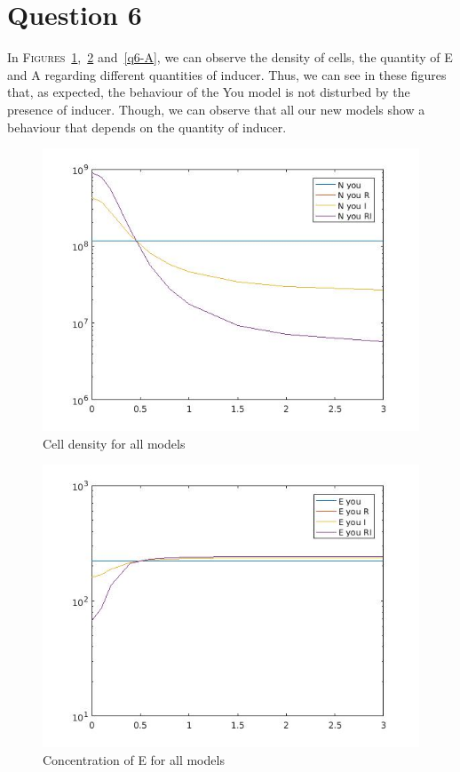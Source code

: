 \documentclass[11pt,a4paper]{report}
\begin{document}
\section*{Question 6}
In \textsc{Figures}~\ref{q6-N},~\ref{q6-E} and~\ref{q6-A}, we can observe the density of cells, the quantity of E and A regarding different quantities of inducer. Thus, we can see in these figures that, as expected, the behaviour of the You model is not disturbed by the presence of inducer. Though, we can observe that all our new models show a behaviour that depends on the quantity of inducer.

\begin{figure}[!ht]
  \begin{center}
    \includegraphics[width=0.7\linewidth]{Figure5.jpg}
    \caption{Cell density for all models}
    \label{q6-N}
  \end{center}
\end{figure}

\begin{figure}[!ht]
  \begin{center}
    \includegraphics[width=0.7\linewidth]{Figure6.jpg}
    \caption{Concentration of E for all models}
    \label{q6-E}
  \end{center}
\end{figure}
\end{document}

